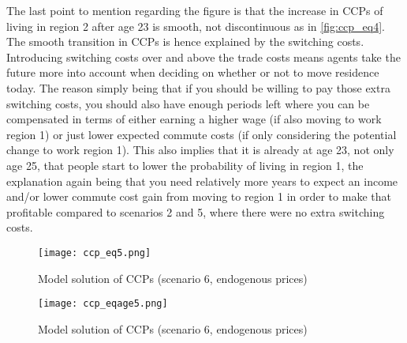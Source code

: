The last point to mention regarding the figure is that the increase in CCPs of living in region 2  after age 23 is smooth, not discontinuous as in \autoref{fig:ccp_eq4}. The smooth transition in CCPs is hence explained by the switching costs. Introducing switching costs over and above the trade costs means agents take the future more into account when deciding on whether or not to move residence today. The reason simply being that if you should be willing to pay those extra switching costs, you should also have enough periods left where you can be compensated in terms of either earning a higher wage (if also moving to work region 1) or just lower expected commute costs (if only considering the potential change to work region 1). This also implies that it is already at age 23, not only age 25, that people start to lower the probability of living in region 1, the explanation again being that you need relatively more years to expect an income and/or lower commute cost gain from moving to region 1 in order to make that profitable compared to scenarios 2 and 5, where there were no extra switching costs.
\begin{figure}
\centering
\texttt{[image: ccp\_eq5.png]} 
\caption{Model solution of CCPs (scenario 6, endogenous prices)}
\label{fig:ccp_eq5}
\end{figure}

\begin{figure}
\centering
\texttt{[image: ccp\_eqage5.png]} 
\caption{Model solution of CCPs (scenario 6, endogenous prices)}
\label{fig:ccp_eqage5}
\end{figure}




